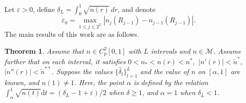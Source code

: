 \documentclass[11pt,reqno]{amsart}
\newtheorem{theorem}{Theorem}[section]
\theoremstyle{definition}
\theoremstyle{remark}
\numberwithin{equation}{section}
\begin{document}
Let $\varepsilon > 0$, define $\delta_L = \int_{0}^{1} \sqrt{n(r)}\, dr$, and denote
\begin{equation*}
	\varepsilon_0=\max_{1\leq j\leq 2^L}\left|n_{j}(R_{j-1})-n_{j-1}(R_{j-1})\right|.~
\end{equation*}
The main results of this work are as follows.
\begin{theorem}\label{thm:uniqueness}
	Assume that $n\in C_p^2[0,1]$ with $L$ intervals and $n\in \mathcal{M}$. Assume further that on each interval, it satisfies $0 < n_* < n(r) < n^*$,~$ |n'(r)|<\tilde{n}^{*}$,~$|n''(r)|<\tilde{n}^{**}$. Suppose the values $\{\hat{\delta}_l\}_{l=1}^{L}$ and the value of $n$ on $[\alpha, 1]$ are known, and $n(1)\neq 1$. Here, the point $\alpha$ is defined by the relation $\int_{\alpha}^{1} \sqrt{n(t)}  \mathrm{d}t = (\delta_L - 1 + \varepsilon)/2$ when $\delta \geq 1$, and $\alpha =1$ when $\delta_L <1$.
	

\end{theorem}
\end{document}

